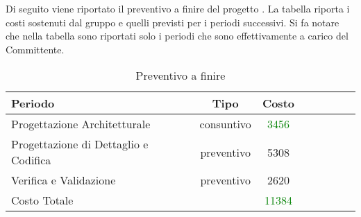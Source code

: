 Di seguito viene riportato il preventivo a finire del progetto \PROGETTO{}. La tabella riporta i costi sostenuti dal gruppo e quelli previsti per i periodi successivi. Si fa notare che nella tabella sono riportati solo i periodi che sono effettivamente a carico del Committente.

\begin{table}[h]
	\centering
	\begin{tabular}{|l|c|c|c|c|c|c|c|}
		\toprule
		\textbf{Periodo} & \textbf{Tipo} & \textbf{Costo} \\
		
		\midrule
		Progettazione Architetturale & consuntivo & \textcolor{green}{3456} \\
		Progettazione di Dettaglio e Codifica & preventivo & 5308 \\ 
		Verifica e Validazione & preventivo & 2620 \\
		
		\midrule
		Costo Totale & & \textcolor{green}{11384} \\
				
		\bottomrule
	\end{tabular}
	\caption{Preventivo a finire}
\end{table}
